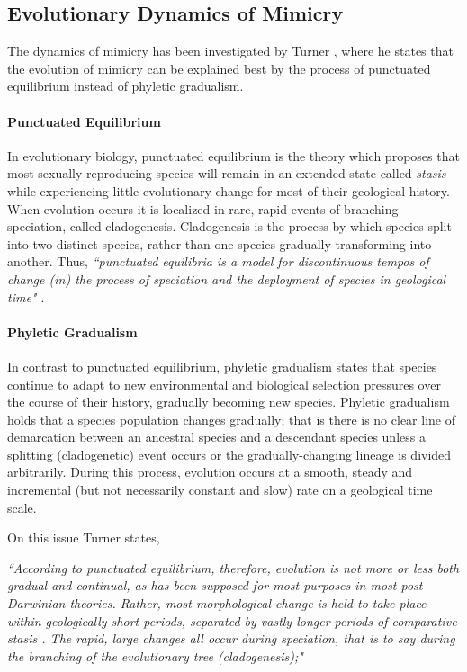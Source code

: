 \documentclass[letterpaper]{article}
\numberwithin{equation}{section}
\begin{document}
\subsection{Evolutionary Dynamics of Mimicry}
\label{subsec:evolutionary-dynamics-of-mimicry}
The dynamics of mimicry has been investigated by Turner \cite{turner1988}, where he states that the evolution of mimicry can be explained best by the process of punctuated equilibrium instead of phyletic gradualism. 

\paragraph{Punctuated Equilibrium}
In evolutionary biology, punctuated equilibrium is the theory which proposes that most sexually reproducing species will remain in an extended state called \textit{stasis} while experiencing little evolutionary change for most of their geological history. When evolution occurs it is localized in rare, rapid events of branching speciation, called cladogenesis. Cladogenesis is the process by which species split into two distinct species, rather than one species gradually transforming into another. Thus, \textsl{``punctuated equilibria is a model for discontinuous tempos of change (in) the process of speciation and the deployment of species in geological time" \cite{gould1977}}. 

\paragraph{Phyletic Gradualism}
In contrast to punctuated equilibrium, phyletic gradualism states that species continue to adapt to new environmental and biological selection pressures over the course of their history, gradually becoming new species. Phyletic gradualism holds that a species population changes gradually; that is there is no clear line of demarcation between an ancestral species and a descendant species unless a splitting (cladogenetic) event occurs or the gradually-changing lineage is divided arbitrarily. During this process, evolution occurs at a smooth, steady and incremental (but not necessarily constant and slow) rate on a geological time scale. 

On this issue Turner states,

\textsl{``According to punctuated equilibrium, therefore, evolution is not more or less both gradual and continual, as has been supposed for most purposes in most post-Darwinian theories. Rather, most morphological change is held to take place within geologically short periods, separated by vastly longer periods of comparative stasis \cite{eldredge1972}. The rapid, large changes all occur during speciation, that is to say during the branching of the evolutionary tree (cladogenesis);" \cite{turner1988}}
\end{document}

